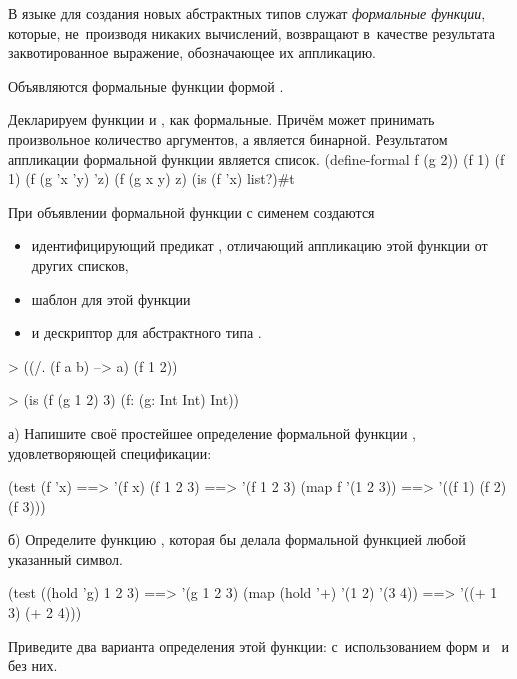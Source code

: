 В языке \Scheme для создания новых абстрактных типов служат \emph{формальные функции}, которые, не~производя никаких вычислений, возвращают в~качестве результата заквотированное выражение, обозначающее их аппликацию.

Объявляются формальные функции формой .

\begin{example}{%
Декларируем функции  и , как формальные. Причём  может принимать произвольное количество аргументов, а  является бинарной. Результатом аппликации формальной функции является список.}
\REPLin
  {(define-formal f (g 2))}
\REPL
  {(f 1)}
  {(f 1)}
\REPL
  {(f (g 'x 'y) 'z)}
  {(f (g x y) z)}
\REPL
  {(is (f 'x) list?)}{#t}
\end{example}

\begin{example}{%
При объявлении формальной функции с сименем  создаются
\begin{itemize}
\item идентифицирующий предикат , отличающий аппликацию этой функции от других списков, 
\item шаблон для этой функции  
\item и дескриптор для абстрактного типа .
\end{itemize}}
\smallskip
\begin{ExampleCode}
> ((/. (f a b) --> a) 
   (f 1 2))
\end{ExampleCode}
\smallskip
\begin{ExampleCode}
> (is (f (g 1 2) 3)
      (f: (g: Int Int) Int))
\end{ExampleCode}
\end{example}

\vspace{-\bigskipamount}
\begin{Assignment}
а) Напишите своё простейшее определение формальной функции , удовлетворяющей спецификации:
\begin{Specification}
(test 
  (f 'x)                ==> '(f x)
  (f 1 2 3)             ==> '(f 1 2 3)
  (map f '(1 2 3))      ==> '((f 1) (f 2) (f 3)))
\end{Specification}

б) Определите функцию , которая бы делала формальной функцией любой указанный символ. 
\begin{Specification}
(test 
 ((hold 'g) 1 2 3)             ==> '(g 1 2 3)
 (map (hold '+) '(1 2) '(3 4)) ==> '((+ 1 3) (+ 2 4)))
\end{Specification}

Приведите два варианта определения этой функции: с~использованием форм  и~ и без них.
\end{Assignment}

